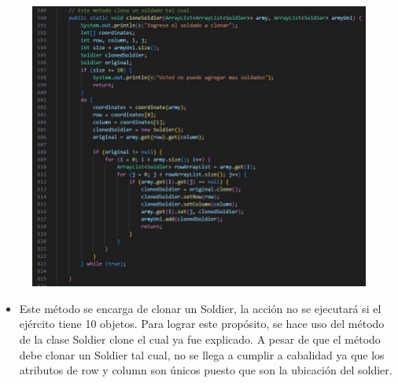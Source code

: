 \documentclass{article}
\begin{document}
	\begin{figure}[H]
		\centering
		\includegraphics[width=1\textwidth,keepaspectratio]{img/cloneSoldier.jpg}
	\end{figure}
	
	
	\begin{itemize}	
		\item Este método se encarga de clonar un Soldier, la acción no se ejecutará si el ejército tiene 10 objetos. Para lograr este propósito, se hace uso del método de la clase Soldier clone el cual ya fue explicado. A pesar de que el método debe clonar un Soldier tal cual, no se llega a cumplir a cabalidad ya que los atributos de row y column son únicos puesto que son la ubicación del soldier.
	\end{itemize}
	
\end{document}
